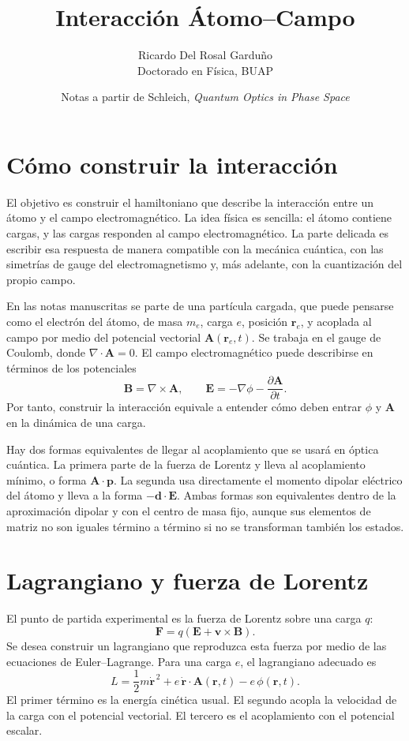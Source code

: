 \documentclass[11pt]{article}
\title{Interacci\'on \'Atomo--Campo}
\author{Ricardo Del Rosal Gardu\~no \\ \small Doctorado en F\'isica, BUAP}
\date{Notas a partir de Schleich, \emph{Quantum Optics in Phase Space}}
\newcommand{\vb}[1]{\mathbf{#1}}
\begin{document}
\maketitle

\section{C\'omo construir la interacci\'on}

El objetivo es construir el hamiltoniano que describe la interacci\'on entre un
\'atomo y el campo electromagn\'etico. La idea f\'isica es sencilla: el \'atomo
contiene cargas, y las cargas responden al campo electromagn\'etico. La parte
delicada es escribir esa respuesta de manera compatible con la mec\'anica
cu\'antica, con las simetr\'ias de gauge del electromagnetismo y, m\'as
adelante, con la cuantizaci\'on del propio campo.

En las notas manuscritas se parte de una part\'icula cargada, que puede pensarse
como el electr\'on del \'atomo, de masa \(m_e\), carga \(e\), posici\'on
\(\vb r_e\), y acoplada al campo por medio del potencial vectorial
\(\vb A(\vb r_e,t)\). Se trabaja en el gauge de Coulomb, donde
\(\nabla\cdot\vb A=0\). El campo electromagn\'etico puede describirse en
t\'erminos de los potenciales
\begin{equation}
  \vb B=\nabla\times\vb A,
  \qquad
  \vb E=-\nabla\phi-\frac{\partial\vb A}{\partial t}.
\end{equation}
Por tanto, construir la interacci\'on equivale a entender c\'omo deben entrar
\(\phi\) y \(\vb A\) en la din\'amica de una carga.

Hay dos formas equivalentes de llegar al acoplamiento que se usar\'a en \'optica
cu\'antica. La primera parte de la fuerza de Lorentz y lleva al acoplamiento
m\'inimo, o forma \(\vb A\cdot\vb p\). La segunda usa directamente el momento
dipolar el\'ectrico del \'atomo y lleva a la forma \(-\vb d\cdot\vb E\). Ambas
formas son equivalentes dentro de la aproximaci\'on dipolar y con el centro de
masa fijo, aunque sus elementos de matriz no son iguales t\'ermino a t\'ermino
si no se transforman tambi\'en los estados.

\section{Lagrangiano y fuerza de Lorentz}

El punto de partida experimental es la fuerza de Lorentz sobre una carga \(q\):
\begin{equation}
  \vb F
  =
  q\left(\vb E+\vb v\times\vb B\right).
\end{equation}
Se desea construir un lagrangiano que reproduzca esta fuerza por medio de las
ecuaciones de Euler--Lagrange. Para una carga \(e\), el lagrangiano adecuado es
\begin{equation}
  L
  =
  \frac{1}{2}m\dot{\vb r}^{\,2}
  +e\,\dot{\vb r}\cdot\vb A(\vb r,t)
  -e\,\phi(\vb r,t).
\end{equation}
El primer t\'ermino es la energ\'ia cin\'etica usual. El segundo acopla la
velocidad de la carga con el potencial vectorial. El tercero es el acoplamiento
con el potencial escalar.
\end{document}
